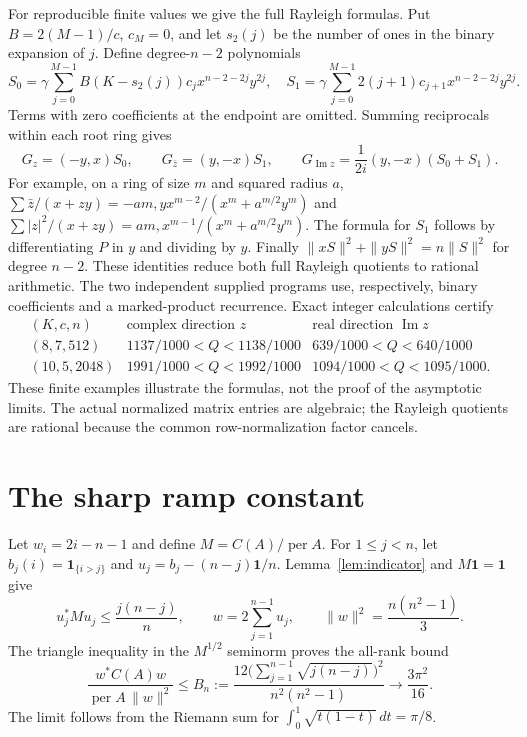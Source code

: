 \documentclass[11pt]{article}
\DeclareMathOperator{\per}{per}
\DeclareMathOperator{\Imm}{Im}
\newcommand{\one}{\mathbf 1}
\begin{document}
For reproducible finite values we give the full Rayleigh formulas. Put
$B=2(M-1)/c$, $c_M=0$, and let $s_2(j)$ be the number of ones in the binary
expansion of $j$. Define degree-$n-2$ polynomials
\[
 S_0=\gamma\sum_{j=0}^{M-1}B(K-s_2(j))c_jx^{n-2-2j}y^{2j},\quad
 S_1=\gamma\sum_{j=0}^{M-1}2(j+1)c_{j+1}x^{n-2-2j}y^{2j}.
\]
Terms with zero coefficients at the endpoint are omitted. Summing reciprocals
within each root ring gives
\[
 G_z=(-y,x)S_0,\qquad G_{\bar z}=(y,-x)S_1,
 \qquad G_{\Imm z}=\frac1{2i}(y,-x)(S_0+S_1).
\]
For example, on a ring of size $m$ and squared radius $a$,
$\sum\bar z/(x+zy)=-am,yx^{m-2}/(x^m+a^{m/2}y^m)$ and
$\sum|z|^2/(x+zy)=am,x^{m-1}/(x^m+a^{m/2}y^m)$.
The formula for $S_1$ follows by differentiating $P$ in $y$ and dividing by
$y$. Finally $\|xS\|^2+\|yS\|^2=n\|S\|^2$ for degree $n-2$.
These identities reduce both full Rayleigh quotients to rational arithmetic.
The two independent supplied programs use, respectively, binary coefficients
and a marked-product recurrence. Exact integer calculations certify
\[
 \begin{array}{c|c|c}
 (K,c,n)&\text{complex direction }z&\text{real direction }\Imm z\\\hline
 (8,7,512)&1137/1000<Q<1138/1000&639/1000<Q<640/1000\\
 (10,5,2048)&1991/1000<Q<1992/1000&1094/1000<Q<1095/1000.
 \end{array}
\]
These finite examples illustrate the formulas, not the proof of the asymptotic
limits. The actual normalized matrix entries are algebraic; the Rayleigh
quotients are rational because the common row-normalization factor cancels.

\section{The sharp ramp constant}
Let $w_i=2i-n-1$ and define $M=C(A)/\per A$. For $1\le j<n$, let
$b_j(i)=\one_{\{i>j\}}$ and $u_j=b_j-(n-j)\one/n$. Lemma~\ref{lem:indicator}
and $M\one=\one$ give
\[
 u_j^*Mu_j\le\frac{j(n-j)}n,
 \qquad w=2\sum_{j=1}^{n-1}u_j,
 \qquad\|w\|^2=\frac{n(n^2-1)}3.
\]
The triangle inequality in the $M^{1/2}$ seminorm proves the all-rank bound
\begin{equation}\label{eq:ramp}
 \frac{w^*C(A)w}{\per A\,\|w\|^2}
 \le B_n:=\frac{12\bigl(\sum_{j=1}^{n-1}\sqrt{j(n-j)}\bigr)^2}
                 {n^2(n^2-1)}
 \longrightarrow\frac{3\pi^2}{16}.
\end{equation}
The limit follows from the Riemann sum for
$\int_0^1\sqrt{t(1-t)}\,dt=\pi/8$.
\end{document}
